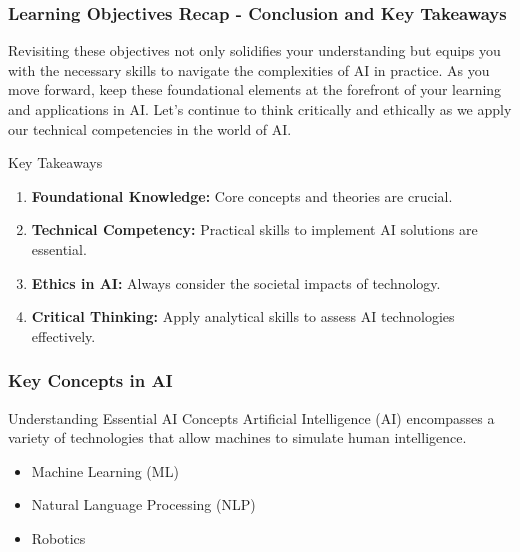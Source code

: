 \documentclass[aspectratio=169]{beamer}
\begin{document}
\begin{frame}[fragile]
    \frametitle{Learning Objectives Recap - Conclusion and Key Takeaways}
    Revisiting these objectives not only solidifies your understanding but equips you with the necessary skills to navigate the complexities of AI in practice. 
    As you move forward, keep these foundational elements at the forefront of your learning and applications in AI. Let’s continue to think critically and ethically as we apply our technical competencies in the world of AI.

    \begin{block}{Key Takeaways}
        \begin{enumerate}
            \item \textbf{Foundational Knowledge:} Core concepts and theories are crucial.
            \item \textbf{Technical Competency:} Practical skills to implement AI solutions are essential.
            \item \textbf{Ethics in AI:} Always consider the societal impacts of technology.
            \item \textbf{Critical Thinking:} Apply analytical skills to assess AI technologies effectively.
        \end{enumerate}
    \end{block}
\end{frame}

\begin{frame}[fragile]
    \frametitle{Key Concepts in AI}
    \begin{block}{Understanding Essential AI Concepts}
        Artificial Intelligence (AI) encompasses a variety of technologies that allow machines to simulate human intelligence.
    \end{block}
    \begin{itemize}
        \item Machine Learning (ML)
        \item Natural Language Processing (NLP)
        \item Robotics
    \end{itemize}
\end{frame}
\end{document}

